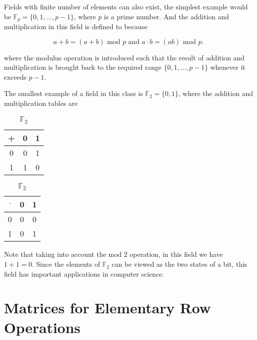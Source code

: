 \documentclass[a4paper,12pt]{report}
\begin{document}
\begin{appendices}
Fields with finite number of elements can also exist, the simplest example would be \(\mathbb{F}_{p} = \{0,1,\ldots ,p-1\} \), where \(p\) is a prime number. And the addition and multiplication in this field is defined to because

\begin{equation}
    a + b = (a+b) \text{ mod } p \text { and } a \cdot b = (ab) \text{ mod } p. 
\end{equation}

where the modulus operation is introduced such that the result of addition and multiplication is brought back to the required range \(\{0,1,\ldots ,p-1\}\) whenever it exceeds \(p-1\).

The smallest example of a field in this class is \(\mathbb{F} _{2}  = \{0,1\} \), where the addition and multiplication tables are


\begin{table}[H]
    \begin{minipage}[t]{0.5\linewidth}
    \centering
    \begin{tabular}{c|c|c}
        \toprule
          +   &  0  &  1 \\
        \midrule
          0   &  0  &  1 \\
          1   &  1  &  0 \\
        \bottomrule
    \end{tabular}
    \caption{ \(\mathbb{F}_{2}  \) }
\label{add}
\end{minipage} 
\begin{minipage}[t]{0.5\linewidth}
    \centering
    \begin{tabular}{c|c|c}
        \toprule
          \(\cdot \)    & 0 & 1  \\
        \midrule
            0 & 0 &  0 \\
            1 & 0 &  1 \\
        \bottomrule
    \end{tabular}
    \caption{ \(\mathbb{F}_{2}  \)  }
\label{mul}
\end{minipage}
\end{table}

Note that taking into account the \(\text{mod } 2 \) operation, in this field we have \(1+1 = 0\). Since the elements of \(\mathbb{F}_{2}  \) can be viewed as the two states of a bit, this field has important applications in computer science. 

\section{Matrices for Elementary Row Operations} \label{APA} 


\end{appendices}
\end{document}
